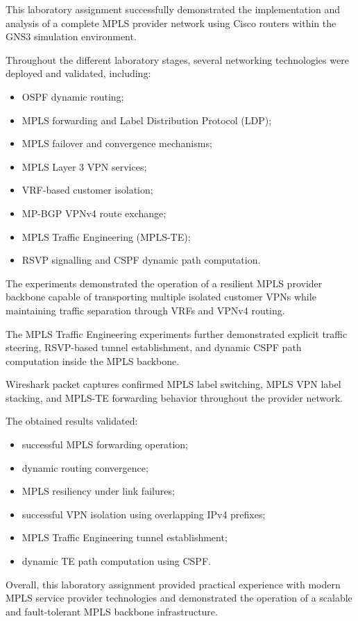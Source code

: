 \documentclass[12pt]{article}
\begin{document}
This laboratory assignment successfully demonstrated the implementation and analysis of a complete MPLS provider network using Cisco routers within the GNS3 simulation environment.

Throughout the different laboratory stages, several networking technologies were deployed and validated, including:
\begin{itemize}
    \item OSPF dynamic routing;
    \item MPLS forwarding and Label Distribution Protocol (LDP);
    \item MPLS failover and convergence mechanisms;
    \item MPLS Layer 3 VPN services;
    \item VRF-based customer isolation;
    \item MP-BGP VPNv4 route exchange;
    \item MPLS Traffic Engineering (MPLS-TE);
    \item RSVP signalling and CSPF dynamic path computation.
\end{itemize}

The experiments demonstrated the operation of a resilient MPLS provider backbone capable of transporting multiple isolated customer VPNs while maintaining traffic separation through VRFs and VPNv4 routing.

The MPLS Traffic Engineering experiments further demonstrated explicit traffic steering, RSVP-based tunnel establishment, and dynamic CSPF path computation inside the MPLS backbone.

Wireshark packet captures confirmed MPLS label switching, MPLS VPN label stacking, and MPLS-TE forwarding behavior throughout the provider network.

The obtained results validated:
\begin{itemize}
    \item successful MPLS forwarding operation;
    \item dynamic routing convergence;
    \item MPLS resiliency under link failures;
    \item successful VPN isolation using overlapping IPv4 prefixes;
    \item MPLS Traffic Engineering tunnel establishment;
    \item dynamic TE path computation using CSPF.
\end{itemize}

Overall, this laboratory assignment provided practical experience with modern MPLS service provider technologies and demonstrated the operation of a scalable and fault-tolerant MPLS backbone infrastructure.
\end{document}
